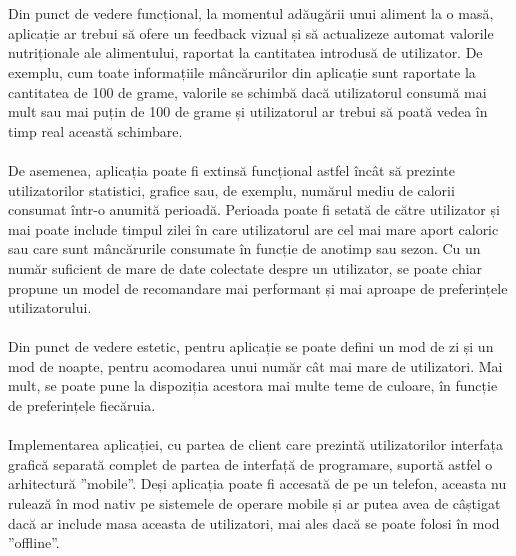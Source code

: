 \\ \\
Din punct de vedere funcțional, la momentul adăugării unui aliment la o masă, aplicație ar trebui să ofere un feedback vizual și să actualizeze automat valorile nutriționale ale alimentului, raportat la cantitatea introdusă de utilizator. De exemplu, cum toate informațiile mâncărurilor din aplicație sunt raportate la cantitatea de 100 de grame, valorile se schimbă dacă utilizatorul consumă mai mult sau mai puțin de 100 de grame și utilizatorul ar trebui să poată vedea în timp real această schimbare.
\\ \\
De asemenea, aplicația poate fi extinsă funcțional astfel încât să prezinte utilizatorilor statistici, grafice sau, de exemplu, numărul mediu de calorii consumat într-o anumită perioadă. Perioada poate fi setată de către utilizator și mai poate include timpul zilei în care utilizatorul are cel mai mare aport caloric sau care sunt mâncărurile consumate în funcție de anotimp sau sezon. Cu un număr suficient de mare de date colectate despre un utilizator, se poate chiar propune un model de recomandare mai performant și mai aproape de preferințele utilizatorului.
\\ \\
Din punct de vedere estetic, pentru aplicație se poate defini un mod de zi și un mod de noapte, pentru acomodarea unui număr cât mai mare de utilizatori. Mai mult, se poate pune la dispoziția acestora mai multe teme de culoare, în funcție de preferințele fiecăruia.
\\ \\
Implementarea aplicației, cu partea de client care prezintă utilizatorilor interfața grafică separată complet de partea de interfață de programare, suportă astfel o arhitectură ”mobile”. Deși aplicația poate fi accesată de pe un telefon, aceasta nu rulează în mod nativ pe sistemele de operare mobile și ar putea avea de câștigat dacă ar include masa aceasta de utilizatori, mai ales dacă se poate folosi în mod ”offline”.